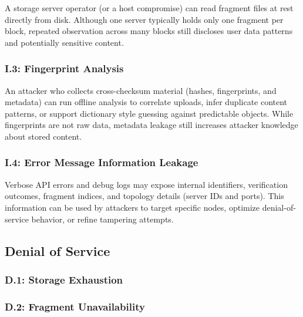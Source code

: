 \documentclass[../veristore_security_model.tex]{subfiles}
\begin{document}
A storage server operator (or a host compromise) can read fragment files at rest directly from
disk. Although one server typically holds only one fragment per block, repeated observation
across many blocks still discloses user data patterns and potentially sensitive content.

\subsubsection{I.3: Fingerprint Analysis}

An attacker who collects cross-checksum material (hashes, fingerprints, and metadata) can run
offline analysis to correlate uploads, infer duplicate content patterns, or support dictionary
style guessing against predictable objects. While fingerprints are not raw data, metadata leakage
still increases attacker knowledge about stored content.

\subsubsection{I.4: Error Message Information Leakage}

Verbose API errors and debug logs may expose internal identifiers, verification outcomes,
fragment indices, and topology details (server IDs and ports). This information can be used by
attackers to target specific nodes, optimize denial-of-service behavior, or refine tampering
attempts.

\subsection{Denial of Service}


\subsubsection{D.1: Storage Exhaustion}


\subsubsection{D.2: Fragment Unavailability}
\end{document}
